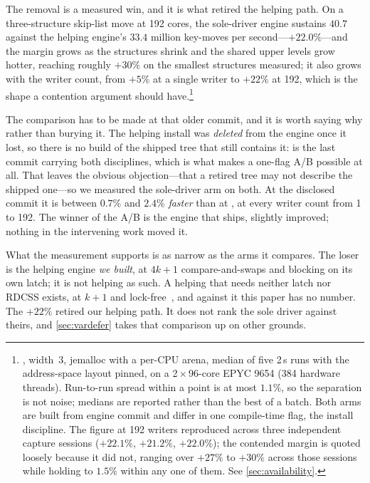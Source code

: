 \documentclass[11pt]{article}
\begin{document}
The removal is a measured win, and it is what retired the helping path. On a
three-structure skip-list move at 192 cores, the sole-driver engine sustains
$40.7$ against the helping engine's $33.4$ million key-moves per
second---$+22.0\%$---and the margin grows as the structures shrink and the
shared upper levels grow hotter, reaching roughly $+30\%$ on the smallest
structures measured; it also grows with the
writer count, from $+5\%$ at a single writer to $+22\%$ at 192, which is the
shape a contention argument should have.\footnote{,
width~3, jemalloc with a per-CPU arena, median of five 2\,s runs with the
address-space layout pinned, on a 2\,$\times$\,96-core EPYC 9654
(384 hardware threads). Run-to-run spread within a point is at most $1.1\%$, so
the separation is not noise; medians are reported rather than the best of a
batch. Both arms are built from engine commit  and differ in one
compile-time flag, the install discipline. The figure at 192 writers reproduced
across three independent capture sessions ($+22.1\%$, $+21.2\%$, $+22.0\%$);
the contended margin is quoted loosely because it did not, ranging over
$+27\%$ to $+30\%$ across those sessions while holding to $1.5\%$ within any
one of them. See \cref{sec:availability}.}

The comparison has to be made at that older commit, and it is worth saying why
rather than burying it. The helping install was \emph{deleted} from the engine
once it lost, so there is no build of the shipped tree that still contains it:
 is the last commit carrying both disciplines, which is what makes
a one-flag A/B possible at all. That leaves the obvious objection---that a
retired tree may not describe the shipped one---so we measured the sole-driver
arm on both. At the disclosed commit it is between $0.7\%$ and $2.4\%$
\emph{faster} than at , at every writer count from 1 to 192. The
winner of the A/B is the engine that ships, slightly improved; nothing in the
intervening work moved it.

What the measurement supports is as narrow as the arms it compares. The loser is
the helping engine \emph{we built}, at $4k+1$ compare-and-swaps and blocking on
its own latch; it is not helping as such. A helping \kcas that needs neither
latch nor RDCSS exists, at $k+1$ and lock-free~\citep{guerraoui2020mcas}, and
against it this paper has no number. The $+22\%$ retired our helping path. It
does not rank the sole driver against theirs, and \cref{sec:vardefer} takes that
comparison up on other grounds.
\end{document}
